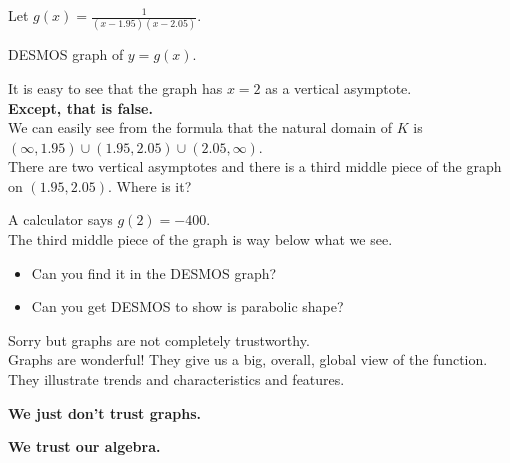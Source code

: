 \documentclass{ximera}
\begin{document}
\begin{example}


Let $g(x) = \frac{1}{(x-1.95)(x-2.05)}$.


DESMOS graph of $y = g(x)$.



\begin{center}
\end{center}



It is easy to see that the graph has $x=2$ as a vertical asymptote. \\

\textbf{\textcolor{red!70!black}{Except, that is false.}} \\

We can easily see from the formula that the natural domain of $K$ is $(\infty, 1.95) \cup (1.95, 2.05) \cup (2.05, \infty)$.\\

There are two vertical asymptotes and there is a third middle piece of the graph on $(1.95, 2.05)$. Where is it?


A calculator says $g(2)=-400$. \\

The third middle piece of the graph is way below what we see.  

\begin{itemize}
\item Can you find it in the DESMOS graph?
\item Can you get DESMOS to show is parabolic shape?
\end{itemize}




\end{example}


Sorry but graphs are not completely trustworthy.  \\


Graphs are wonderful!  They give us a big, overall, global view of the function.  They illustrate trends and characteristics and features.


\begin{center}
\textbf{\textcolor{red!70!black}{We just don't trust graphs.}}
\end{center}



\begin{center}
\textbf{\textcolor{blue!55!black}{We trust our algebra.}}
\end{center}
\end{document}
